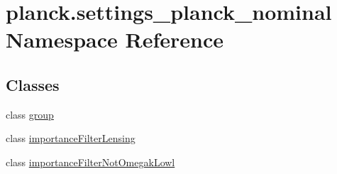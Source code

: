 \hypertarget{namespaceplanck_1_1settings__planck__nominal}{}\section{planck.\+settings\+\_\+planck\+\_\+nominal Namespace Reference}
\label{namespaceplanck_1_1settings__planck__nominal}
\subsection*{Classes}
\begin{DoxyCompactItemize}
\item 
class \mbox{\hyperlink{classplanck_1_1settings__planck__nominal_1_1group}{group}}
\item 
class \mbox{\hyperlink{classplanck_1_1settings__planck__nominal_1_1importanceFilterLensing}{importance\+Filter\+Lensing}}
\item 
class \mbox{\hyperlink{classplanck_1_1settings__planck__nominal_1_1importanceFilterNotOmegakLowl}{importance\+Filter\+Not\+Omegak\+Lowl}}
\end{DoxyCompactItemize}
